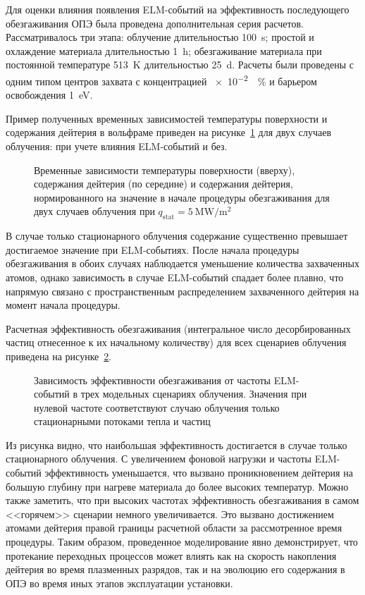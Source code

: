 Для оценки влияния появления ELM-событий на эффективность последующего обезгаживания ОПЭ была проведена дополнительная серия расчетов. Рассматривалось три этапа: облучение длительностью \SI{100}{\second}; простой и охлаждение материала длительностью \SI{1}{\hour}; обезгаживание материала при постоянной температуре \SI{513}{\kelvin} длительностью \SI{25}{\day}. Расчеты были проведены с одним типом центров захвата с концентрацией \SI{e-2}{\percent} и барьером освобождения \SI{1}{\electronvolt}. 

Пример полученных временных зависимостей температуры поверхности и содержания дейтерия в вольфраме приведен на рисунке~\cref{fig:ch3/baking_single} для двух случаев облучения: при учете влияния ELM-событий и без.
\begin{figure}[ht]
	\caption{Временные зависимости температуры поверхности (вверху), содержания дейтерия (по середине) и содержания дейтерия, нормированного на значение в начале процедуры обезгаживания для двух случаев облучения при \(q_\mathrm{stat}= \SI{5}{\mega\watt\per\meter\squared}\)}\label{fig:ch3/baking_single}
\end{figure}
В случае только стационарного облучения содержание существенно превышает достигаемое значение при ELM-событиях. После начала процедуры обезгаживания в обоих случаях наблюдается уменьшение количества захваченных атомов, однако зависимость в случае ELM-событий спадает более плавно, что напрямую связано с пространственным распределением захваченного дейтерия на момент начала процедуры.

Расчетная эффективность обезгаживания (интегральное число десорбированных частиц отнесенное к их начальному количеству) для всех сценариев облучения приведена на рисунке~\cref{fig:ch3/baking_efficiency}.
\begin{figure}[ht]
	\caption{Зависимость эффективности обезгаживания от частоты ELM-событий в трех модельных сценариях облучения. Значения при нулевой частоте соответствуют случаю облучения только стационарными потоками тепла и частиц}\label{fig:ch3/baking_efficiency}
\end{figure}
Из рисунка видно, что наибольшая эффективность достигается в случае только стационарного облучения. С увеличением фоновой нагрузки и частоты ELM-событий эффективность уменьшается, что вызвано проникновением дейтерия на большую глубину при нагреве материала до более высоких температур. Можно также заметить, что при высоких частотах эффективность обезгаживания в самом <<горячем>> сценарии немного увеличивается. Это вызвано достижением атомами дейтерия правой границы расчетной области за рассмотренное время процедуры. Таким образом, проведенное моделирование явно демонстрирует, что протекание переходных процессов может влиять как на скорость накопления дейтерия во время плазменных разрядов, так и на эволюцию его содержания в ОПЭ во время иных этапов эксплуатации установки. 


